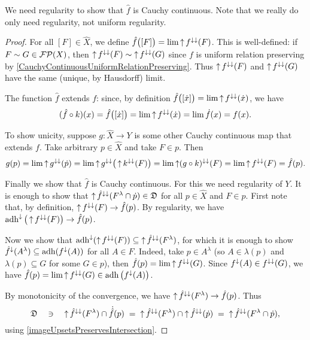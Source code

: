We need regularity to show that $\hat{f}$ is Cauchy continuous. Note that we really do only need regularity, not uniform regularity.
\begin{proof}
For all $[F]\in \hat{X}$, we define $\hat{f}\big([F]\big) = \lim \operatorname{\uparrow} f^{\downarrow\downarrow}(F)$. This is well-defined: if $F\sim G\in \operatorname{\mathcal{FP}}(X)$, then $\operatorname{\uparrow} f^{\downarrow\downarrow}(F) \sim \operatorname{\uparrow} f^{\downarrow\downarrow}(G)$ since $f$ is uniform relation preserving by \ref{CauchyContinuousUniformRelationPreserving}. Thus $\operatorname{\uparrow} f^{\downarrow\downarrow}(F)$ and $\operatorname{\uparrow} f^{\downarrow\downarrow}(G)$ have the same (unique, by Hausdorff) limit.

The function $\hat{f}$ extends $f$: since, by definition $\hat{f}\big([\dot{x}]\big) = \lim \operatorname{\uparrow} f^{\downarrow\downarrow}(\dot{x})$, we have
\[ (\hat{f}\circ k)(x) = \hat{f}\big([\dot{x}]\big) = \lim \operatorname{\uparrow} f^{\downarrow\downarrow}(\dot{x}) = \lim \dot{f}(x) = f(x). \]

To show unicity, suppose $g: \hat{X}\to Y$ is some other Cauchy continuous map that extends $f$. Take arbitrary $p\in \hat{X}$ and take $F\in p$. Then
\[ g(p) = \lim \operatorname{\uparrow} g^{\downarrow\downarrow}(\dot{p}) = \lim \operatorname{\uparrow} g^{\downarrow\downarrow}\big(\operatorname{\uparrow} k^{\downarrow\downarrow}(F)\big) = \lim\operatorname{\uparrow} (g\circ k)^{\downarrow\downarrow}(F) = \lim\operatorname{\uparrow} f^{\downarrow\downarrow}(F) = \hat{f}(p). \]

Finally we show that $\hat{f}$ is Cauchy continuous. For this we need regularity of $Y$.
It is enough to show that $\operatorname{\uparrow} \hat{f}^{\downarrow\downarrow}(F^\lambda \cap \dot{p}) \in \mathfrak{D}$ for all $p\in \hat{X}$ and $F\in p$. First note that, by definition, $\operatorname{\uparrow} f^{\downarrow\downarrow}(F) \to \hat{f}(p)$. By regularity, we have $\operatorname{adh}^\downarrow\big(\operatorname{\uparrow} f^{\downarrow\downarrow}(F)\big) \to \hat{f}(p)$.

Now we show that $\operatorname{adh}^{\downarrow}(\operatorname{\uparrow} f^{\downarrow\downarrow}(F)) \subseteq \operatorname{\uparrow}\hat{f}^{\downarrow\downarrow}(F^\lambda)$, for which it is enough to show $\hat{f}^\downarrow(A^\lambda) \subseteq \operatorname{adh}(f^\downarrow(A))$ for all $A\in F$. Indeed, take $p\in A^\lambda$ (so $A \in \lambda(p)$ and $\lambda(p) \subseteq G$ for some $G\in p$), then $\hat{f}(p) = \lim \operatorname{\uparrow} f^{\downarrow\downarrow}(G)$. Since $f^\downarrow(A) \in f^{\downarrow\downarrow}(G)$, we have $\hat{f}(p) = \lim \operatorname{\uparrow} f^{\downarrow\downarrow}(G) \in \operatorname{adh}\big(f^\downarrow(A)\big)$.

By monotonicity of the convergence, we have $\operatorname{\uparrow}\hat{f}^{\downarrow\downarrow}(F^\lambda) \to \hat{f}(p)$. Thus
\[ \mathfrak{D} \quad\ni\quad \operatorname{\uparrow}\hat{f}^{\downarrow\downarrow}(F^\lambda) \cap \dot{\hat{f}}(p) \; = \; \operatorname{\uparrow}\hat{f}^{\downarrow\downarrow}(F^\lambda) \cap \operatorname{\uparrow} \hat{f}^{\downarrow\downarrow}(\dot{p}) \; = \; \operatorname{\uparrow}\hat{f}^{\downarrow\downarrow}(F^\lambda \cap \dot{p}), \]
using \ref{imageUpsetsPreservesIntersection}.
\end{proof}


